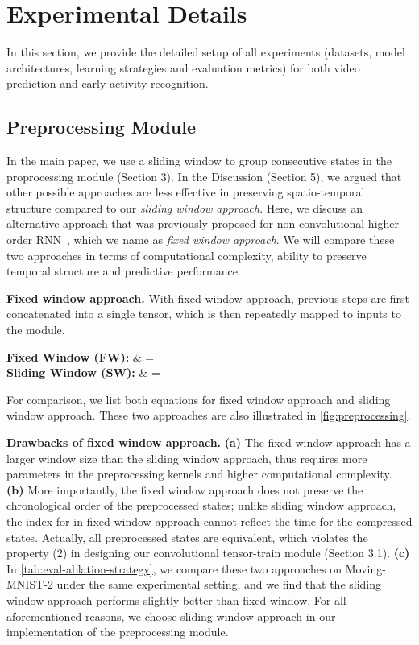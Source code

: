 \section{Experimental Details}
\label{app:exp}

In this section, we provide the detailed setup of all experiments (datasets, model architectures, learning strategies and evaluation metrics) for both video prediction and early activity recognition.

\subsection{Preprocessing Module}
\label{app-sub:preprocessing}

In the main paper, we use a sliding window to group consecutive states in the proprocessing module (Section 3). In the Discussion (Section 5), we argued that other possible approaches are less effective in preserving spatio-temporal structure compared to our {\em sliding window approach}. Here, we discuss an alternative approach that was previously proposed for non-convolutional higher-order RNN~\citep{yu2017long}, which we name as {\em fixed window approach}. We will compare these two approaches in terms of computational complexity, ability to preserve temporal structure and predictive performance.

\textbf{Fixed window approach.} 
With fixed window approach,  previous steps  are first concatenated into a single tensor, which is then repeatedly mapped to  inputs  to the  module.

\textbf{Fixed Window (FW): \quad}
& = 
 \ast {} \\
\textbf{Sliding Window (SW): \quad}
& =
 \ast {}

For comparison, we list both equations for fixed window approach and sliding window approach. These two approaches are also illustrated in \autoref{fig:preprocessing}.

\textbf{Drawbacks of fixed window approach.}
{\bf(a)} The {fixed window approach} has a larger window size than the {sliding window approach}, thus requires more parameters in the preprocessing kernels and higher computational complexity.
{\bf(b)} More importantly, the fixed window approach does not preserve the chronological order of the preprocessed states; unlike sliding window approach, the index  for  in fixed window approach cannot reflect the time for the compressed states. Actually, all preprocessed states  are equivalent, which violates the property (2) in designing our convolutional tensor-train module (Section 3.1).
{\bf(c)} In \autoref{tab:eval-ablation-strategy}, we compare these two approaches on Moving-MNIST-2 under the same experimental setting, and we find that the sliding window approach performs slightly better than fixed window.
For all aforementioned reasons, we choose {sliding window approach} in our implementation of the preprocessing module.

